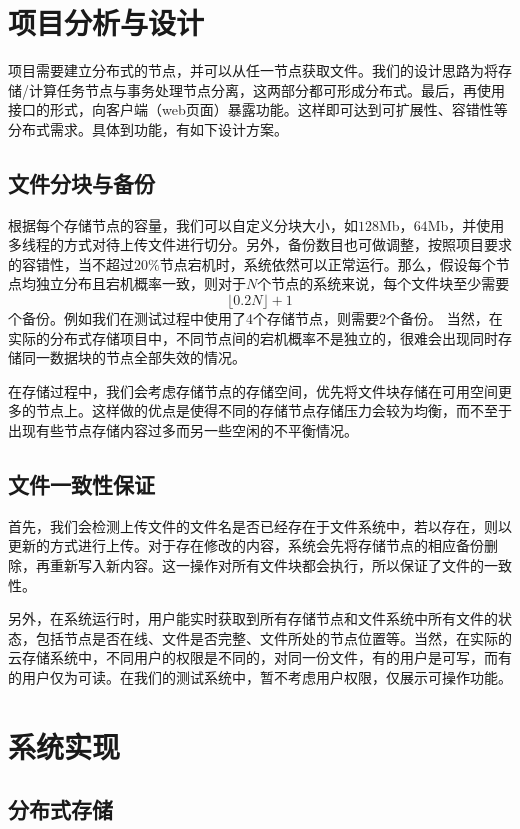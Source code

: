 \documentclass[12pt,a4paper]{article}
\begin{document}
\clearpage

\section{项目分析与设计}
项目需要建立分布式的节点，并可以从任一节点获取文件。我们的设计思路为将存储/计算任务节点与事务处理节点分离，这两部分都可形成分布式。最后，再使用接口的形式，向客户端（web页面）暴露功能。这样即可达到可扩展性、容错性等分布式需求。具体到功能，有如下设计方案。
\subsection{文件分块与备份}
根据每个存储节点的容量，我们可以自定义分块大小，如$128$Mb，$64$Mb，并使用多线程的方式对待上传文件进行切分。另外，备份数目也可做调整，按照项目要求的容错性，当不超过$20\%$节点宕机时，系统依然可以正常运行。那么，假设每个节点均独立分布且宕机概率一致，则对于$N$个节点的系统来说，每个文件块至少需要
\begin{equation}
\lfloor 0.2N \rfloor+1
\end{equation}
个备份。例如我们在测试过程中使用了4个存储节点，则需要$2$个备份。 当然，在实际的分布式存储项目中，不同节点间的宕机概率不是独立的，很难会出现同时存储同一数据块的节点全部失效的情况。

在存储过程中，我们会考虑存储节点的存储空间，优先将文件块存储在可用空间更多的节点上。这样做的优点是使得不同的存储节点存储压力会较为均衡，而不至于出现有些节点存储内容过多而另一些空闲的不平衡情况。
\subsection{文件一致性保证}
首先，我们会检测上传文件的文件名是否已经存在于文件系统中，若以存在，则以更新的方式进行上传。对于存在修改的内容，系统会先将存储节点的相应备份删除，再重新写入新内容。这一操作对所有文件块都会执行，所以保证了文件的一致性。

另外，在系统运行时，用户能实时获取到所有存储节点和文件系统中所有文件的状态，包括节点是否在线、文件是否完整、文件所处的节点位置等。当然，在实际的云存储系统中，不同用户的权限是不同的，对同一份文件，有的用户是可写，而有的用户仅为可读。在我们的测试系统中，暂不考虑用户权限，仅展示可操作功能。

\section{系统实现}
\subsection{分布式存储}
\end{document}
